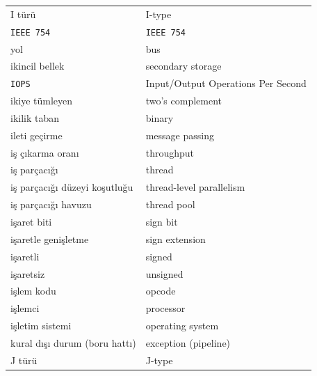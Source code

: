 {\begin{longtable}{@{}p{7.6cm}p{7.6cm}@{}}
I türü & I-type \\
\texttt{IEEE 754} & \texttt{IEEE 754} \\
yol & bus \\
ikincil bellek & secondary storage \\
\texttt{IOPS} & Input/Output Operations Per Second \\
ikiye tümleyen & two's complement \\
ikilik taban & binary \\
ileti geçirme & message passing \\
iş çıkarma oranı & throughput \\
iş parçacığı & thread \\
iş parçacığı düzeyi koşutluğu & thread-level parallelism \\
iş parçacığı havuzu & thread pool \\
işaret biti & sign bit \\
işaretle genişletme & sign extension \\
işaretli & signed \\
işaretsiz & unsigned \\
işlem kodu & opcode \\
işlemci & processor \\
işletim sistemi & operating system \\
kural dışı durum (boru hattı) & exception (pipeline) \\

J türü & J-type \\


\end{longtable}}
